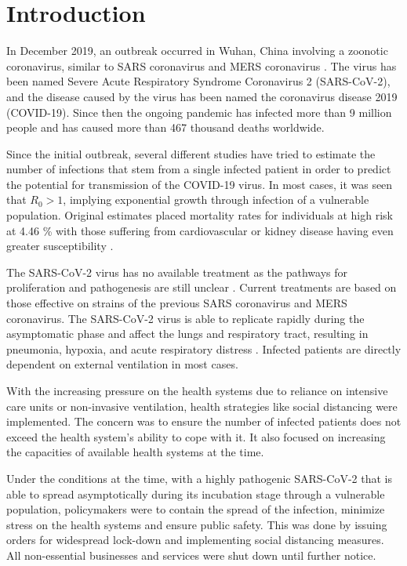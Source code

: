 \documentclass[preprint,authoryear,12pt]{elsarticle}
\begin{document}
	
\section{Introduction}
	\label{SEC1}
	In December 2019, an outbreak occurred in Wuhan, China involving a zoonotic coronavirus, similar to SARS coronavirus and MERS coronavirus  \cite{taaa021}. The virus has been named Severe Acute Respiratory Syndrome Coronavirus 2 (SARS-CoV-2), and the disease caused by the virus has been named the coronavirus disease 2019 (COVID-19). Since then the ongoing pandemic has infected more than 9 million people and has caused more than 467 thousand deaths worldwide.
	
	Since the initial outbreak, several different studies have tried to estimate the number of infections \cite{GN2020} that stem from a single infected patient in order to predict the potential for transmission of the COVID-19 virus. In most cases, it was seen that $R_0 > 1$, implying exponential growth through infection of a vulnerable population. Original estimates placed mortality rates for individuals at high risk at  4.46 \% with those suffering from cardiovascular or kidney disease having even greater susceptibility \cite{BPH2020}. 
	
	The SARS-CoV-2 virus has no available treatment as the pathways for proliferation and pathogenesis are still unclear \cite{RIS2020}.  Current treatments are based on those effective on strains of the previous SARS coronavirus and MERS coronavirus. The SARS-CoV-2  virus is able to replicate rapidly during the asymptomatic phase and affect the lungs and respiratory tract, resulting in pneumonia, hypoxia, and acute respiratory distress \cite{PSL2020}. Infected patients are directly dependent on external ventilation in most cases. 
	
	
	With the increasing pressure on the health systems due to reliance on intensive care units or non-invasive ventilation, health strategies like social distancing were implemented. The concern was to ensure the number of infected patients does not exceed the health system’s ability to cope with it. It also focused on increasing the capacities of available health systems at the time.
	
	
	Under the conditions at the time, with a highly pathogenic SARS-CoV-2 that is able to spread asymptotically during its incubation stage through a vulnerable population, policymakers were to contain the spread of the infection, minimize stress on the health systems and ensure public safety. This was done by issuing orders for widespread lock-down and implementing social distancing measures. All non-essential businesses and services were shut down until further notice. 
	
\end{document}
